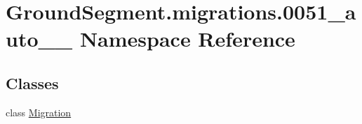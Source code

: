 \hypertarget{namespace_ground_segment_1_1migrations_1_10051__auto__20170313__1436}{}\section{Ground\+Segment.\+migrations.0051\+\_\+auto\+\_\+\_ Namespace Reference}
\label{namespace_ground_segment_1_1migrations_1_10051__auto__20170313__1436}
\subsection*{Classes}
\begin{DoxyCompactItemize}
\item 
class \hyperlink{class_ground_segment_1_1migrations_1_10051__auto__20170313__1436_1_1_migration}{Migration}
\end{DoxyCompactItemize}
